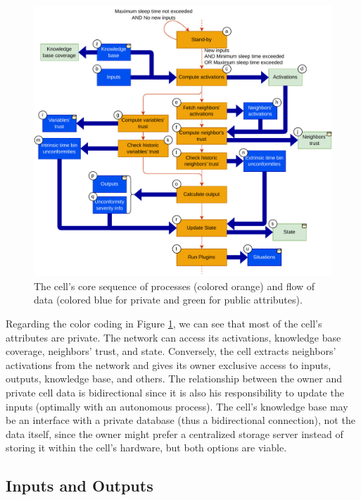 \begin{figure}[h!]
    \centering
    \includegraphics[width=\textwidth]{figures/chapter4/cell/processes.pdf}
    \caption{The cell's core sequence of processes (colored orange) and flow of data (colored blue for private and green for public attributes).}
    \label{fig:cellprocesses}
\end{figure}

Regarding the color coding in Figure \ref{fig:cellprocesses}, we can see that most of the cell's attributes are private. The network can access its activations, knowledge base coverage, neighbors' trust, and state. Conversely, the cell extracts neighbors' activations from the network and gives its owner exclusive access to inputs, outputs, knowledge base, and others. The relationship between the owner and private cell data is bidirectional since it is also his responsibility to update the inputs (optimally with an autonomous process). The cell's knowledge base may be an interface with a private database (thus a bidirectional connection), not the data itself, since the owner might prefer a centralized storage server instead of storing it within the cell's hardware, but both options are viable.

\subsection{Inputs and Outputs} \label{subsec:inout}

